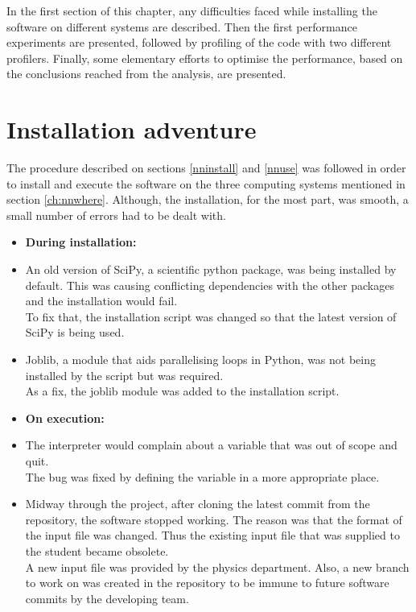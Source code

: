 

In the first section of this chapter, any difficulties faced while installing the software on different systems are described. Then the first performance experiments are presented, followed by profiling of the code with two different profilers. Finally, some elementary efforts to optimise the performance, based on the conclusions reached from the analysis, are presented.



\section{Installation adventure}

        The procedure described on sections \ref{nninstall} and \ref{nnuse} was followed in order to install and execute the software on the three computing systems mentioned in section \ref{ch:nnwhere}. Although, the installation, for the most part, was smooth, a small number of errors had to be dealt with.
        
        \begin{itemize}
            \item[]\textbf{During installation:}
            \item An old version of SciPy, a scientific python package, was being installed by default. This was causing conflicting dependencies with the other packages and the installation would fail. \\
            To fix that, the installation script was changed so that the latest version of SciPy is being used.
            \item Joblib, a module that aids parallelising loops in Python, was not being installed by the script but was required.\\
            As a fix, the joblib module was added to the installation script.
            \item[]\textbf{On execution:}
            \item The interpreter would complain about a variable that was out of scope and quit.\\
            The bug was fixed by defining the variable in a more appropriate place.
            \item Midway through the project, after cloning the latest commit from the repository, the software stopped working. The reason was that the format of the input file was changed. Thus the existing input file that was supplied to the student became obsolete.\\
            A new input file was provided by the physics department. Also, a new branch to work on was created in the repository to be immune to future software commits by the developing team.  
        \end{itemize}
        

